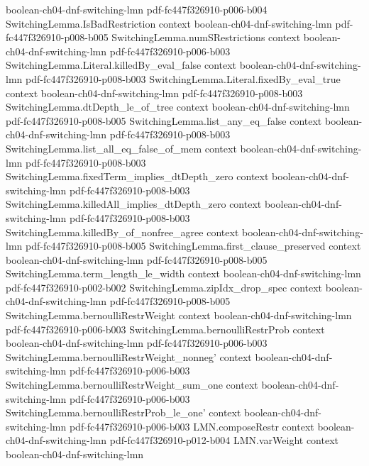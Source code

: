 \begin{theorem}
  {boolean-ch04-dnf-switching-lmn}
  {pdf-fc447f326910-p006-b004}
\proofstep
  {SwitchingLemma.IsBadRestriction}
  {context}
  {boolean-ch04-dnf-switching-lmn}
  {pdf-fc447f326910-p008-b005}
\proofstep
  {SwitchingLemma.numSRestrictions}
  {context}
  {boolean-ch04-dnf-switching-lmn}
  {pdf-fc447f326910-p006-b003}
\proofstep
  {SwitchingLemma.Literal.killedBy_eval_false}
  {context}
  {boolean-ch04-dnf-switching-lmn}
  {pdf-fc447f326910-p008-b003}
\proofstep
  {SwitchingLemma.Literal.fixedBy_eval_true}
  {context}
  {boolean-ch04-dnf-switching-lmn}
  {pdf-fc447f326910-p008-b003}
\proofstep
  {SwitchingLemma.dtDepth_le_of_tree}
  {context}
  {boolean-ch04-dnf-switching-lmn}
  {pdf-fc447f326910-p008-b005}
\proofstep
  {SwitchingLemma.list_any_eq_false}
  {context}
  {boolean-ch04-dnf-switching-lmn}
  {pdf-fc447f326910-p008-b003}
\proofstep
  {SwitchingLemma.list_all_eq_false_of_mem}
  {context}
  {boolean-ch04-dnf-switching-lmn}
  {pdf-fc447f326910-p008-b003}
\proofstep
  {SwitchingLemma.fixedTerm_implies_dtDepth_zero}
  {context}
  {boolean-ch04-dnf-switching-lmn}
  {pdf-fc447f326910-p008-b003}
\proofstep
  {SwitchingLemma.killedAll_implies_dtDepth_zero}
  {context}
  {boolean-ch04-dnf-switching-lmn}
  {pdf-fc447f326910-p008-b003}
\proofstep
  {SwitchingLemma.killedBy_of_nonfree_agree}
  {context}
  {boolean-ch04-dnf-switching-lmn}
  {pdf-fc447f326910-p008-b005}
\proofstep
  {SwitchingLemma.first_clause_preserved}
  {context}
  {boolean-ch04-dnf-switching-lmn}
  {pdf-fc447f326910-p008-b005}
\proofstep
  {SwitchingLemma.term_length_le_width}
  {context}
  {boolean-ch04-dnf-switching-lmn}
  {pdf-fc447f326910-p002-b002}
\proofstep
  {SwitchingLemma.zipIdx_drop_spec}
  {context}
  {boolean-ch04-dnf-switching-lmn}
  {pdf-fc447f326910-p008-b005}
\proofstep
  {SwitchingLemma.bernoulliRestrWeight}
  {context}
  {boolean-ch04-dnf-switching-lmn}
  {pdf-fc447f326910-p006-b003}
\proofstep
  {SwitchingLemma.bernoulliRestrProb}
  {context}
  {boolean-ch04-dnf-switching-lmn}
  {pdf-fc447f326910-p006-b003}
\proofstep
  {SwitchingLemma.bernoulliRestrWeight_nonneg'}
  {context}
  {boolean-ch04-dnf-switching-lmn}
  {pdf-fc447f326910-p006-b003}
\proofstep
  {SwitchingLemma.bernoulliRestrWeight_sum_one}
  {context}
  {boolean-ch04-dnf-switching-lmn}
  {pdf-fc447f326910-p006-b003}
\proofstep
  {SwitchingLemma.bernoulliRestrProb_le_one'}
  {context}
  {boolean-ch04-dnf-switching-lmn}
  {pdf-fc447f326910-p006-b003}
\proofstep
  {LMN.composeRestr}
  {context}
  {boolean-ch04-dnf-switching-lmn}
  {pdf-fc447f326910-p012-b004}
\proofstep
  {LMN.varWeight}
  {context}
  {boolean-ch04-dnf-switching-lmn}

\end{theorem}
